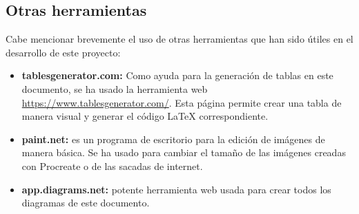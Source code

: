 \subsection{Otras herramientas}
Cabe mencionar brevemente el uso de otras herramientas que han sido útiles en el desarrollo de este proyecto:
\begin{itemize}
	\item \textbf{tablesgenerator.com:} Como ayuda para la generación de tablas en este documento, se ha usado la herramienta web \url{https://www.tablesgenerator.com/}. Esta página permite crear una tabla de manera visual y generar el código \LaTeX{} correspondiente.
	\item \textbf{paint.net:} es un programa de escritorio para la edición de imágenes de manera básica. Se ha usado para cambiar el tamaño de las imágenes creadas con Procreate o de las sacadas de internet.
	\item \textbf{app.diagrams.net:} potente herramienta web usada para crear todos los diagramas de este documento.
\end{itemize}